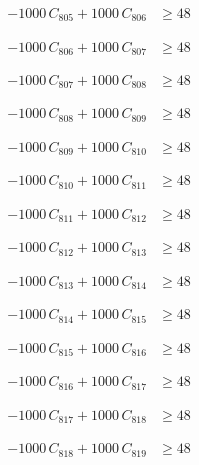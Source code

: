 \documentclass[a4paper,11pt]{article}
\begin{document}
\begin{align}
-1000\,C_{805} + 1000\,C_{806} &\geq 48 \nonumber
\end{align}

\begin{align}
-1000\,C_{806} + 1000\,C_{807} &\geq 48 \nonumber
\end{align}

\begin{align}
-1000\,C_{807} + 1000\,C_{808} &\geq 48 \nonumber
\end{align}

\begin{align}
-1000\,C_{808} + 1000\,C_{809} &\geq 48 \nonumber
\end{align}

\begin{align}
-1000\,C_{809} + 1000\,C_{810} &\geq 48 \nonumber
\end{align}

\begin{align}
-1000\,C_{810} + 1000\,C_{811} &\geq 48 \nonumber
\end{align}

\begin{align}
-1000\,C_{811} + 1000\,C_{812} &\geq 48 \nonumber
\end{align}

\begin{align}
-1000\,C_{812} + 1000\,C_{813} &\geq 48 \nonumber
\end{align}

\begin{align}
-1000\,C_{813} + 1000\,C_{814} &\geq 48 \nonumber
\end{align}

\begin{align}
-1000\,C_{814} + 1000\,C_{815} &\geq 48 \nonumber
\end{align}

\begin{align}
-1000\,C_{815} + 1000\,C_{816} &\geq 48 \nonumber
\end{align}

\begin{align}
-1000\,C_{816} + 1000\,C_{817} &\geq 48 \nonumber
\end{align}

\begin{align}
-1000\,C_{817} + 1000\,C_{818} &\geq 48 \nonumber
\end{align}

\begin{align}
-1000\,C_{818} + 1000\,C_{819} &\geq 48 \nonumber
\end{align}
\end{document}
